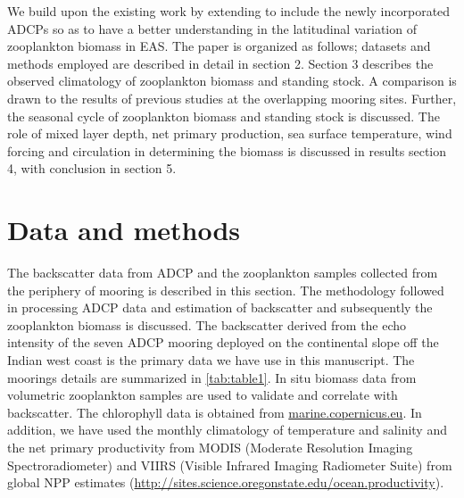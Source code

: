 \documentclass{article}
\begin{document}
	We build upon the existing work by extending to include the newly incorporated ADCPs so as to have a better understanding in the latitudinal variation of zooplankton biomass in EAS. The paper is organized as follows; datasets and methods employed are described in detail in section 2. Section 3 describes the observed climatology of zooplankton biomass and standing stock. A comparison is drawn to the results of previous studies at the overlapping mooring sites. Further, the seasonal cycle of zooplankton biomass and standing stock is discussed. The role of mixed layer depth, net primary production, sea surface temperature, wind forcing and circulation in determining the biomass is discussed in results section 4, with conclusion in section 5.
	
	\section{Data and methods}
	The  backscatter data from ADCP and the zooplankton samples collected from the periphery of mooring is described in this section. The methodology followed in processing ADCP data and estimation of backscatter and subsequently the zooplankton biomass is discussed. The backscatter derived from the echo intensity of the seven ADCP mooring deployed on the continental slope off the Indian west coast is the primary data we have use in this manuscript. The moorings details are summarized in \autoref{tab:table1}. In situ biomass data from volumetric zooplankton samples are used to validate and correlate with backscatter. The chlorophyll data is obtained from \href{https://data.marine.copernicus.eu/products}{marine.copernicus.eu}. In addition, we have used the monthly climatology of temperature and salinity \citep{chatterjee2012new} and the net primary productivity from MODIS (Moderate Resolution Imaging Spectroradiometer) and VIIRS (Visible Infrared Imaging Radiometer Suite) from global NPP estimates (\href{http://sites.science.oregonstate.edu/ocean.productivity}{http://sites.science.oregonstate.edu/ocean.productivity}). 
	
\end{document}

